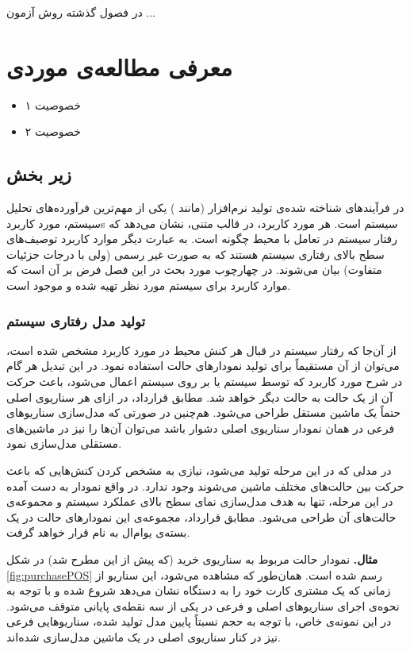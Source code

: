 در فصول گذشته روش آزمون ...

\section{معرفی مطالعه‌ی موردی }
\label{section:caseDesign}
\begin{itemize}
\item خصوصیت ۱

\item خصوصیت ۲
\end{itemize}

\subsection{زیر بخش}
در فرآیندهای شناخته شده‌ی تولید نرم‌افزار (مانند ) یکی از مهم‌ترین فرآورده‌های تحلیل سیستم، \glspl*{مورد کاربرد} سیستم است. هر مورد کاربرد، در قالب متنی، نشان می‌دهد که رفتار سیستم در تعامل با محیط چگونه است. به عبارت دیگر موارد کاربرد توصیف‌های سطح بالای رفتاری سیستم هستند که به صورت غیر رسمی (ولی با درجات جزئیات متفاوت) بیان می‌شوند. در چهارچوب مورد بحث در این فصل فرض بر آن است که موارد کاربرد برای سیستم مورد نظر تهیه شده و موجود است. 

\subsubsection{تولید مدل رفتاری سیستم}
از آن‌جا که رفتار سیستم در قبال هر کنش محیط در مورد کاربرد مشخص شده است، می‌توان از آن مستقیماً برای تولید نمودارهای حالت استفاده نمود. در این تبدیل هر گام در شرح مورد کاربرد که توسط سیستم یا بر روی سیستم اعمال می‌شود، باعث حرکت آن از یک حالت به حالت دیگر خواهد شد. مطابق قرارداد، در ازای هر سناریوی اصلی حتماً یک ماشین مستقل طراحی می‌شود. هم‌چنین در صورتی که مدل‌سازی سناریوهای فرعی در همان نمودار سناریوی اصلی دشوار باشد می‌توان آن‌ها را نیز در ماشین‌های مستقلی مدل‌سازی نمود.

در مدلی که در این مرحله تولید می‌شود، نیازی به مشخص کردن کنش‌‌هایی که باعث حرکت بین حالت‌های مختلف ماشین می‌شوند وجود ندارد. در واقع نمودار به دست آمده در این مرحله، تنها به هدف مدل‌سازی نمای سطح بالای عملکرد سیستم و مجموعه‌ی حالت‌های آن طراحی می‌شود. مطابق قرارداد، مجموعه‌ی این نمودارهای حالت در یک \gls*{بسته‌}ی یو‌ام‌ال به نام {\large{}} قرار خواهد گرفت.

\textbf{مثال. } نمودار حالت مربوط به سناریوی خرید (که پیش از این مطرح شد) در شکل \ref{fig:purchasePOS} رسم شده است. همان‌طور که مشاهده می‌شود، این سناریو از زمانی که یک مشتری کارت خود را به دستگاه نشان می‌دهد شروع شده و با توجه به نحوه‌ی اجرای سناریوهای اصلی و فرعی در یکی از سه نقطه‌ی پایانی متوقف می‌شود. در این نمونه‌ی خاص، با توجه به حجم نسبتاً پایین مدل تولید شده، سناریوهایی فرعی نیز در کنار سناریوی اصلی در یک ماشین مدل‌سازی شده‌اند.


